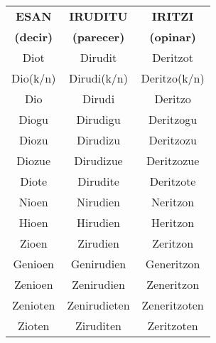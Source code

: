 \documentclass[11pt, a4paper]{article}
\begin{document}
\begin{table}[h]
	\centering
	\begin{tabular}{|c|c|c|}
		\hline
		 \textbf{ESAN}   &  \textbf{IRUDITU}  &  \textbf{IRITZI}  \\
		\textbf{(decir)} & \textbf{(parecer)} & \textbf{(opinar)} \\ \hline\hline
		      Diot       &      Dirudit       &     Deritzot      \\ \hline
		    Dio(k/n)     &    Dirudi(k/n)     &   Deritzo(k/n)    \\ \hline
		      Dio        &       Dirudi       &      Deritzo      \\ \hline
		     Diogu       &      Dirudigu      &     Deritzogu     \\ \hline
		     Diozu       &      Dirudizu      &     Deritzozu     \\ \hline
		     Diozue      &     Dirudizue      &    Deritzozue     \\ \hline
		     Diote       &      Dirudite      &     Deritzote     \\ \hline\hline
		     Nioen       &      Nirudien      &     Neritzon      \\ \hline
		     Hioen       &      Hirudien      &     Heritzon      \\ \hline
		     Zioen       &      Zirudien      &     Zeritzon      \\ \hline
		    Genioen      &     Genirudien     &    Generitzon     \\ \hline
		    Zenioen      &     Zenirudien     &    Zeneritzon     \\ \hline
		    Zenioten     &    Zenirudieten    &   Zeneritzoten    \\ \hline
		     Zioten      &     Ziruditen      &    Zeritzoten     \\ \hline
	\end{tabular}
\end{table}
\end{document}
